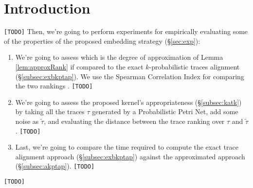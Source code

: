 \section{Introduction}\label{introduction}
\texttt{\color{red}[TODO]}
Then, we're going to perform experiments for empirically evaluating some of the properties of the proposed embedding strategy (\S\ref{sec:exp}):
\begin{enumerate}
	\item We're going to assess which is the degree of approximation of Lemma \ref{lem:approxRank} if compared to the exact $k$-probabilistic traces alignment (\S\ref{subsec:exbkptap}). We use the Spearman Correlation Index for comparing the two rankings \cite{BergamiBM20}. \texttt{\color{red}[TODO]}
	\item We're going to assess the proposed kernel's appropriateness (\S\ref{subsec:katk}) by taking all the traces $\tau$ generated by a Probabilistic Petri Net, add some noise as $\tilde{\tau}$, and evaluating the distance between the trace ranking over $\tau$ and $\tilde{\tau}$. \texttt{\color{red}[TODO]}
	\item Last, we're going to compare the time required to compute the exact trace alignment approach (\S\ref{subsec:exbkptap}) against the approximated approach (\S\ref{subsec:akptap}). \texttt{\color{red}[TODO]}
\end{enumerate}
\texttt{\color{red}[TODO]}

